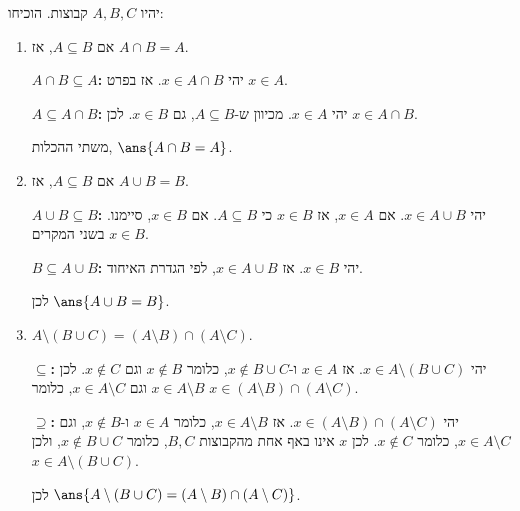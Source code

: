 יהיו $A,B,C$ קבוצות. הוכיחו:
\begin{enumerate}
\item אם $A\subseteq B$, אז $A\cap B=A$.
\begin{solbox}
\textbf{$A\cap B\subseteq A$:} יהי $x\in A\cap B$. אז בפרט $x\in A$.

\textbf{$A\subseteq A\cap B$:} יהי $x\in A$. מכיוון ש-$A\subseteq B$, גם $x\in B$. לכן $x\in A\cap B$.

משתי ההכלות, $\ans{A\cap B=A}$.
\end{solbox}
\item אם $A\subseteq B$, אז $A\cup B=B$.
\begin{solbox}
\textbf{$A\cup B\subseteq B$:} יהי $x\in A\cup B$. אם $x\in A$, אז $x\in B$ כי $A\subseteq B$. אם $x\in B$, סיימנו. בשני המקרים $x\in B$.

\textbf{$B\subseteq A\cup B$:} יהי $x\in B$. אז $x\in A\cup B$, לפי הגדרת האיחוד.

לכן $\ans{A\cup B=B}$.
\end{solbox}
\item $A\setminus(B\cup C)=(A\setminus B)\cap(A\setminus C)$.
\begin{solbox}
\textbf{$\subseteq$:} יהי $x\in A\setminus(B\cup C)$. אז $x\in A$ ו-$x\notin B\cup C$, כלומר $x\notin B$ וגם $x\notin C$. לכן $x\in A\setminus B$ וגם $x\in A\setminus C$, כלומר $x\in(A\setminus B)\cap(A\setminus C)$.

\textbf{$\supseteq$:} יהי $x\in(A\setminus B)\cap(A\setminus C)$. אז $x\in A\setminus B$, כלומר $x\in A$ ו-$x\notin B$, וגם $x\in A\setminus C$, כלומר $x\notin C$. לכן $x$ אינו באף אחת מהקבוצות $B,C$, כלומר $x\notin B\cup C$, ולכן $x\in A\setminus(B\cup C)$.

לכן $\ans{A\setminus(B\cup C)=(A\setminus B)\cap(A\setminus C)}$.
\end{solbox}
\end{enumerate}
